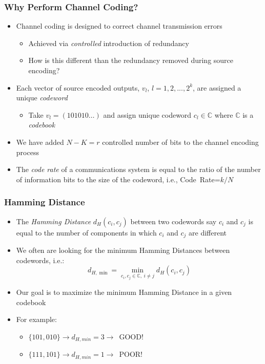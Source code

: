 \documentclass[10pt]{beamer}
\begin{document}
\frame
{
  \frametitle{Why Perform Channel Coding?}
  \begin{itemize}
    \item Channel coding is designed to correct channel transmission errors
    \begin{itemize}
        \item Achieved via {\it controlled} introduction of redundancy
        \item How is this different than the redundancy removed during source encoding?
    \end{itemize}
    \item Each vector of source encoded outputs, $v_{l}$, $l=1,2,...,2^k$, are assigned a unique {\it codeword}
    \begin{itemize}
        \item Take $v_{l}=(101010\ldots)$ and assign unique codeword ${c_l}\in{\mathbb{C}}$ where $\mathbb{C}$ is a {\it codebook}
    \end{itemize}
    \item We have added $N-K=r$ controlled number of bits to the channel encoding process
    \item The {\it code rate} of a communications system is equal to the ratio of the number of information bits to the size of the codeword, i.e., Code~Rate=$k/N$
  \end{itemize}

}
\frame
{
  \frametitle{Hamming Distance}

    \begin{itemize}
       \item The {\it Hamming Distance} $d_H(c_i,c_j)$ between two codewords say ${c_{i}}$ and ${c_{j}}$ is equal to the number of components in which ${c_{i}}$ and ${c_{j}}$ are different
        \item We often are looking for the minimum Hamming Distances between codewords, i.e.:
        \begin{equation}
            d_{H,\min}=\min\limits_{c_i,c_j\in\mathbb{C},~i\neq{j}}{d_H(c_i,c_j)}
        \end{equation}
        \item Our goal is to maximize the minimum Hamming Distance in a given codebook
        \item For example:
        \begin{itemize}
            \item $\{101,010\}\rightarrow{d_{H,min}}=3\rightarrow$~GOOD!
            \item $\{111,101\}\rightarrow{d_{H,min}}=1\rightarrow$~POOR!
        \end{itemize}
    \end{itemize}

}
\end{document}

